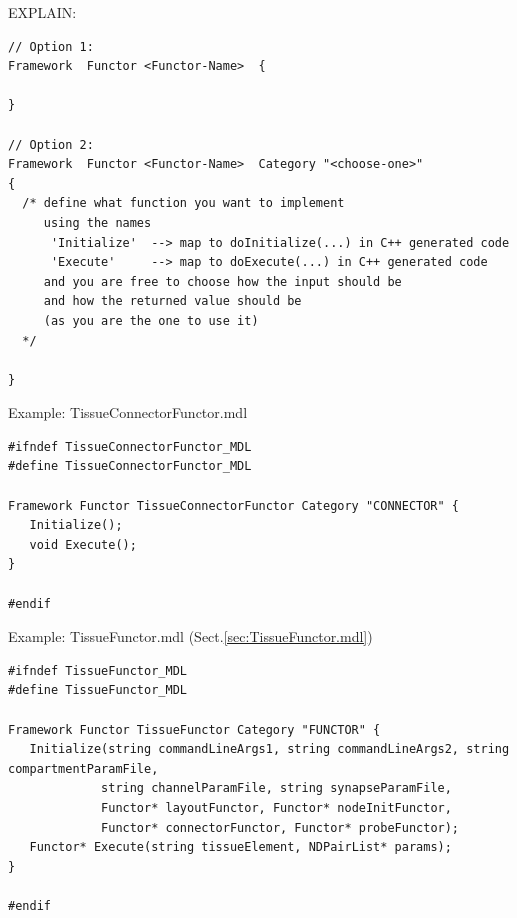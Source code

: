 EXPLAIN:
\begin{verbatim}
// Option 1:
Framework  Functor <Functor-Name>  {

} 

// Option 2:
Framework  Functor <Functor-Name>  Category "<choose-one>" 
{
  /* define what function you want to implement 
     using the names 
      'Initialize'  --> map to doInitialize(...) in C++ generated code 
      'Execute'     --> map to doExecute(...) in C++ generated code
     and you are free to choose how the input should be 
     and how the returned value should be 
     (as you are the one to use it)
  */
  
}
\end{verbatim}


Example: TissueConnectorFunctor.mdl
\begin{verbatim}
#ifndef TissueConnectorFunctor_MDL
#define TissueConnectorFunctor_MDL

Framework Functor TissueConnectorFunctor Category "CONNECTOR" {
   Initialize();
   void Execute();
}

#endif
\end{verbatim}

Example: TissueFunctor.mdl (Sect.\ref{sec:TissueFunctor.mdl})
\begin{verbatim}
#ifndef TissueFunctor_MDL                                                                                                                                                                           
#define TissueFunctor_MDL                                                                                     
                                                                                                              
Framework Functor TissueFunctor Category "FUNCTOR" {                                                          
   Initialize(string commandLineArgs1, string commandLineArgs2, string compartmentParamFile, 
             string channelParamFile, string synapseParamFile, 
             Functor* layoutFunctor, Functor* nodeInitFunctor, 
             Functor* connectorFunctor, Functor* probeFunctor);
   Functor* Execute(string tissueElement, NDPairList* params);                                                
}                                                                                                             
                                                                                                              
#endif                                                                                                        
\end{verbatim}

